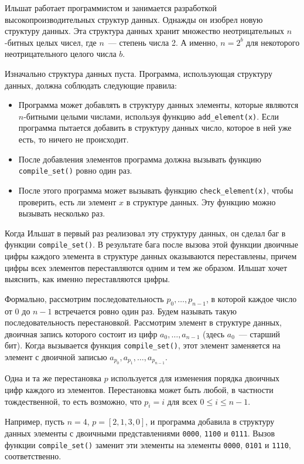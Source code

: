 Ильшат работает программистом и занимается разработкой высокопроизводительных структур данных. Однажды он изобрел новую структуру данных. Эта структура данных хранит множество неотрицательных
$n$-битных целых чисел, где $n$~--- степень числа 2. А именно, $n = 2^b$ для некоторого неотрицательного целого числа $b$.

Изначально структура данных пуста. Программа, использующая структуру данных, должна соблюдать следующие правила:

\begin{itemize}
\item Программа может добавлять в структуру данных элементы, которые являются $n$-битными целыми числами, используя функцию \texttt{add\_element(x)}. Если программа пытается добавить в структуру данных число, которое в ней уже есть, то ничего не происходит.
\item После добавления элементов программа должна вызывать функцию \texttt{compile\_set()} ровно один раз.
\item После этого программа может вызывать функцию \texttt{check\_element(x)}, чтобы проверить, есть ли элемент $x$ в структуре данных. Эту функцию можно вызывать несколько раз.
\end{itemize}

Когда Ильшат в первый раз реализовал эту структуру данных, он сделал баг в функции \texttt{compile\_set()}. В результате бага после вызова этой функции двоичные цифры каждого элемента в структуре данных оказываются переставлены, причем цифры всех элементов переставляются одним и тем же образом. Ильшат хочет выяснить, как именно переставляются цифры.

Формально, рассмотрим последовательность $p_0, \ldots, p_{n - 1}$, в которой каждое число от $0$ до $n - 1$ встречается ровно один раз. Будем называть такую последовательность перестановкой. Рассмотрим элемент в структуре данных, двоичная запись которого состоит из цифр $a_0, \ldots, a_{n - 1}$ (здесь $a_0$~--- старший бит). Когда вызывается функция \texttt{compile\_set()}, этот элемент заменяется на элемент с двоичной записью $a_{p_0}, a_{p_1}, \ldots, a_{p_{n - 1}}$. 

Одна и та же перестановка $p$ используется для изменения порядка двоичных цифр каждого из элементов. Перестановка может быть любой, в частности тождественной, то есть возможно, что $p_i = i$ для всех $0 \le i \le n - 1$.

Например, пусть $n = 4$, $p = [2, 1, 3, 0]$, и программа добавила в структуру данных элементы с двоичными представлениями \texttt{0000}, \texttt{1100} и \texttt{0111}. Вызов функции \texttt{compile\_set()} заменит эти элементы на элементы \texttt{0000}, \texttt{0101} и \texttt{1110}, соответственно.

